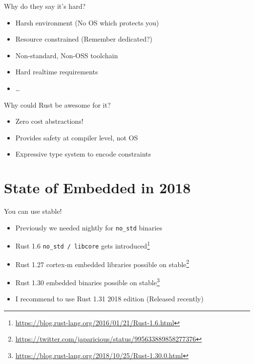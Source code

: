 \documentclass[aspectratio=1610,14pt,t]{beamer}
\begin{document}
\begin{frame}[c]{Why do they say it's hard?}
  \begin{itemize}
    \item Harsh environment (No OS which protects you)
    \item Resource constrained (Remember dedicated?)
    \item Non-standard, Non-OSS toolchain
    \item Hard realtime requirements
    \item \ldots
  \end{itemize}
\end{frame}

\begin{frame}[c]{Why could Rust be awesome for it?}
  \begin{itemize}
    \item Zero cost abstractions!
    \item Provides safety at compiler level, not OS
    \item Expressive type system to encode constraints
  \end{itemize}
\end{frame}

\section{State of Embedded in 2018}
\begin{frame}[c]{You can use stable!}
  \begin{itemize}
    \item Previously we needed nightly for \texttt{no\_std} binaries
    \item Rust 1.6 \texttt{no\_std / libcore} gets
      introduced\footnote{\url{https://blog.rust-lang.org/2016/01/21/Rust-1.6.html}}
    \item Rust 1.27 cortex-m embedded libraries possible on stable\footnote{\url{https://twitter.com/japaricious/status/995633889858277376}}
    \item Rust 1.30 embedded binaries possible on
      stable\footnote{\url{https://blog.rust-lang.org/2018/10/25/Rust-1.30.0.html}}
    \item I recommend to use Rust 1.31 2018 edition (Released recently)
  \end{itemize}
\end{frame}
\end{document}
